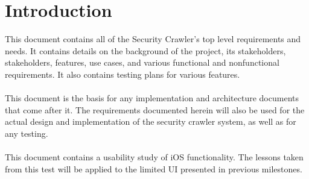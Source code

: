 \section{Introduction}
This document contains all of the Security Crawler's top level requirements and needs.  It contains details on the background of the project, its stakeholders, stakeholders, features, use cases, and various functional and nonfunctional requirements.  It also contains testing plans for various features.\\\\
This document is the basis for any implementation and architecture documents that come after it.  The requirements documented herein will also be used for the actual design and implementation of the security crawler system, as well as for any testing.\\\\
This document contains a usability study of iOS functionality.  The lessons taken from this test will be applied to the limited UI presented in previous milestones.\\\\
